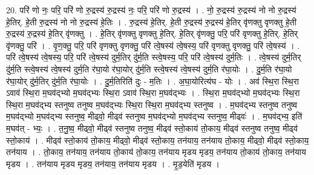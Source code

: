 \documentclass[17pt]{extarticle}
\begin{document}
20. परि॑ णो नः॒ परि॒ परि॑ णो रु॒द्रस्य॑ रु॒द्रस्य॑ नः॒ परि॒ परि॑ णो रु॒द्रस्य॑ । . नो॒ रु॒द्रस्य॑ रु॒द्रस्य॑ नो नो रु॒द्रस्य॑ हे॒तिर्. हे॒ती रु॒द्रस्य॑ नो नो रु॒द्रस्य॑ हे॒तिः । . रु॒द्रस्य॑ हे॒तिर्. हे॒ती रु॒द्रस्य॑ रु॒द्रस्य॑ हे॒तिर् वृ॑णक्तु वृणक्तु हे॒ती रु॒द्रस्य॑ रु॒द्रस्य॑ हे॒तिर् वृ॑णक्तु । . हे॒तिर् वृ॑णक्तु वृणक्तु हे॒तिर्. हे॒तिर् वृ॑णक्तु॒ परि॒ परि॑ वृणक्तु हे॒तिर्. हे॒तिर् वृ॑णक्तु॒ परि॑ । . वृ॒ण॒क्तु॒ परि॒ परि॑ वृणक्तु वृणक्तु॒ परि॑ त्वे॒षस्य॑ त्वे॒षस्य॒ परि॑ वृणक्तु वृणक्तु॒ परि॑ त्वे॒षस्य॑ । . परि॑ त्वे॒षस्य॑ त्वे॒षस्य॒ परि॒ परि॑ त्वे॒षस्य॑ दुर्म॒तिर् दु॑र्म॒ति स्त्वे॒षस्य॒ परि॒ परि॑ त्वे॒षस्य॑ दुर्म॒तिः । . त्वे॒षस्य॑ दुर्म॒तिर् दु॑र्म॒ति स्त्वे॒षस्य॑ त्वे॒षस्य॑ दुर्म॒ति र॑घा॒यो र॑घा॒योर् दु॑र्म॒ति स्त्वे॒षस्य॑ त्वे॒षस्य॑ दुर्म॒ति र॑घा॒योः । . दु॒र्म॒ति र॑घा॒यो र॑घा॒योर् दु॑र्म॒तिर् दु॑र्म॒ति र॑घा॒योः । . दु॒र्म॒तिरिति॑ दुः - म॒तिः । . अ॒घा॒योरित्य॑घ - योः । . अव॑ स्थि॒रा स्थि॒रा ऽवाव॑ स्थि॒रा म॒घव॑द्भ्यो म॒घव॑द्भ्यः स्थि॒रा ऽवाव॑ स्थि॒रा म॒घव॑द्भ्यः । . स्थि॒रा म॒घव॑द्भ्यो म॒घव॑द्भ्यः स्थि॒रा स्थि॒रा म॒घव॑द्भ्य स्तनुष्व तनुष्व म॒घव॑द्भ्यः स्थि॒रा स्थि॒रा म॒घव॑द्भ्य स्तनुष्व । . म॒घव॑द्भ्य स्तनुष्व तनुष्व म॒घव॑द्भ्यो म॒घव॑द्भ्य स्तनुष्व॒ मीढ्वो॒ मीढ्व॑ स्तनुष्व म॒घव॑द्भ्यो म॒घव॑द्भ्य स्तनुष्व॒ मीढ्वः॑ । . म॒घव॑द्भ्य॒ इति॑ म॒घव॑त् - भ्यः॒ । . त॒नु॒ष्व॒ मीढ्वो॒ मीढ्व॑ स्तनुष्व तनुष्व॒ मीढ्व॑ स्तो॒काय॑ तो॒काय॒ मीढ्व॑ स्तनुष्व तनुष्व॒ मीढ्व॑ स्तो॒काय॑ । . मीढ्व॑ स्तो॒काय॑ तो॒काय॒ मीढ्वो॒ मीढ्व॑ स्तो॒काय॒ तन॑याय॒ तन॑याय तो॒काय॒ मीढ्वो॒ मीढ्व॑ स्तो॒काय॒ तन॑याय । . तो॒काय॒ तन॑याय॒ तन॑याय तो॒काय॑ तो॒काय॒ तन॑याय मृडय मृडय॒ तन॑याय तो॒काय॑ तो॒काय॒ तन॑याय मृडय । . तन॑याय मृडय मृडय॒ तन॑याय॒ तन॑याय मृडय । . मृ॒ड॒येति॑ मृडय । \newline
\end{document}

